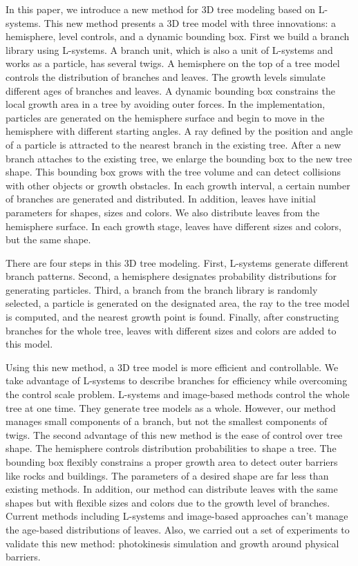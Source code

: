 In this paper, we introduce a new method for 3D tree modeling based on L-systems. This new method presents a 3D tree model with three innovations: a hemisphere, level controls, and a dynamic bounding box. First we build a branch library using L-systems. A branch unit, which is also a unit of L-systems and works as a particle, has several twigs. A hemisphere on the top of a tree model controls the distribution of branches and leaves. The growth levels simulate different ages of branches and leaves. A dynamic bounding box constrains the local growth area in a tree by avoiding outer forces. In the implementation, particles are generated on the hemisphere surface and begin to move in the hemisphere with different starting angles. A ray defined by the position and angle of a particle is attracted to the nearest branch in the existing tree. After a new branch attaches to the existing tree, we enlarge the bounding box to the new tree shape. This bounding box grows with the tree volume and can detect collisions with other objects or growth obstacles. In each growth interval, a certain number of branches are generated and distributed. In addition, leaves have initial parameters for shapes, sizes and colors. We also distribute leaves from the hemisphere surface. In each growth stage, leaves have different sizes and colors, but the same shape. 

There are four steps in this 3D tree modeling. First, L-systems generate different branch patterns. Second, a hemisphere designates probability distributions for generating particles. Third, a branch from the branch library is randomly selected, a particle is generated on the designated area, the ray to the tree model is computed, and the nearest growth point is found.  Finally, after constructing branches for the whole tree, leaves with different sizes and colors are added to this model. 

Using this new method, a 3D tree model is more efficient and controllable. We take advantage of L-systems to describe branches for efficiency while overcoming the control scale problem. L-systems and image-based methods control the whole tree at one time. They generate tree models as a whole. However, our method manages small components of a branch, but not the smallest components of twigs. The second advantage of this new method is the ease of control over tree shape. The hemisphere controls distribution probabilities to shape a tree. The bounding box flexibly constrains a proper growth area to detect outer barriers like rocks and buildings. The parameters of a desired shape are far less than existing methods. In addition, our method can distribute leaves with the same shapes but with flexible sizes and colors due to the growth level of branches. Current methods including L-systems and image-based approaches can't manage the age-based distributions of leaves. Also, we carried out a set of experiments to validate this new method: photokinesis simulation and growth around physical barriers. 

